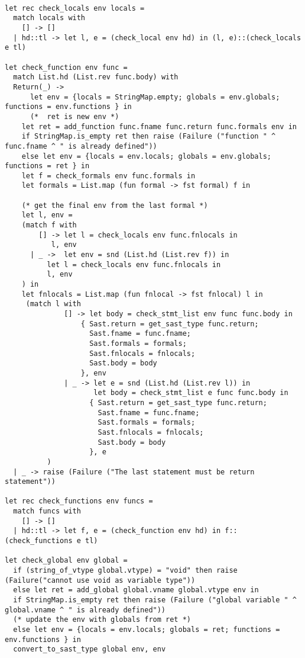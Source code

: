 \documentclass[11pt]{article}
\begin{document}
\begin{listing}[H]
  \begin{verbatim}

let rec check_locals env locals =
  match locals with
    [] -> []
  | hd::tl -> let l, e = (check_local env hd) in (l, e)::(check_locals e tl)

let check_function env func =
  match List.hd (List.rev func.body) with
  Return(_) ->
      let env = {locals = StringMap.empty; globals = env.globals; functions = env.functions } in
      (*  ret is new env *)
    let ret = add_function func.fname func.return func.formals env in
    if StringMap.is_empty ret then raise (Failure ("function " ^ func.fname ^ " is already defined"))
    else let env = {locals = env.locals; globals = env.globals; functions = ret } in
    let f = check_formals env func.formals in
    let formals = List.map (fun formal -> fst formal) f in

    (* get the final env from the last formal *)
    let l, env =
    (match f with
        [] -> let l = check_locals env func.fnlocals in
           l, env
      | _ ->  let env = snd (List.hd (List.rev f)) in
          let l = check_locals env func.fnlocals in
          l, env
    ) in
    let fnlocals = List.map (fun fnlocal -> fst fnlocal) l in
     (match l with
              [] -> let body = check_stmt_list env func func.body in
                  { Sast.return = get_sast_type func.return;
                    Sast.fname = func.fname;
                    Sast.formals = formals;
                    Sast.fnlocals = fnlocals;
                    Sast.body = body
                  }, env
              | _ -> let e = snd (List.hd (List.rev l)) in
                     let body = check_stmt_list e func func.body in
                    { Sast.return = get_sast_type func.return;
                      Sast.fname = func.fname;
                      Sast.formals = formals;
                      Sast.fnlocals = fnlocals;
                      Sast.body = body
                    }, e
          )
  | _ -> raise (Failure ("The last statement must be return statement"))

let rec check_functions env funcs =
  match funcs with
    [] -> []
  | hd::tl -> let f, e = (check_function env hd) in f::(check_functions e tl)

let check_global env global =
  if (string_of_vtype global.vtype) = "void" then raise (Failure("cannot use void as variable type"))
  else let ret = add_global global.vname global.vtype env in
  if StringMap.is_empty ret then raise (Failure ("global variable " ^ global.vname ^ " is already defined"))
  (* update the env with globals from ret *)
  else let env = {locals = env.locals; globals = ret; functions = env.functions } in
  convert_to_sast_type global env, env


\end{verbatim}
\end{listing}
\end{document}
